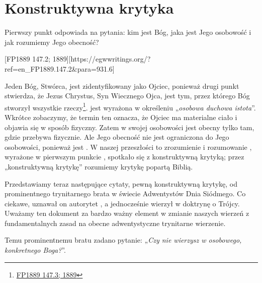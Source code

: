 \chapter{Konstruktywna krytyka}

Pierwszy punkt  odpowiada na pytania: kim jest Bóg, jaka jest Jego osobowość i jak rozumiemy Jego obecność?

[FP1889 147.2; 1889][https://egwwritings.org/?ref=en\_FP1889.147.2&para=931.6]

Jeden Bóg, Stwórca, jest zidentyfikowany jako Ojciec, ponieważ drugi punkt  stwierdza, że Jezus Chrystus, Syn Wiecznego Ojca, jest tym, przez którego Bóg stworzył wszystkie rzeczy\footnote{\href{https://egwwritings.org/?ref=en_FP1889.147.3&para=931.7}{FP1889 147.3; 1889}}.  jest wyrażona w określeniu „\textit{osobowa duchowa istota}”. Wkrótce zobaczymy, że termin ten oznacza, że Ojciec ma materialne ciało i objawia się w sposób fizyczny. Zatem w swojej osobowości jest obecny tylko tam, gdzie przebywa fizycznie. Ale Jego obecność nie jest ograniczona do Jego osobowości, ponieważ jest . W naszej przeszłości to zrozumienie i rozumowanie , wyrażone w pierwszym punkcie , spotkało się z konstruktywną krytyką; przez „konstruktywną krytykę” rozumiemy krytykę popartą Biblią.

Przedstawiamy teraz następujące cytaty, pewną konstruktywną krytykę, od prominentnego trynitarnego brata w świecie Adwentystów Dnia Siódmego. Co ciekawe, uznawał on autorytet , a jednocześnie wierzył w doktrynę o Trójcy. Uważamy ten dokument za bardzo ważny element w zmianie naszych wierzeń z fundamentalnych zasad na obecne adwentystyczne trynitarne wierzenie.

Temu prominentnemu bratu zadano pytanie: „\textit{Czy nie wierzysz w osobowego, konkretnego Boga?}”.


